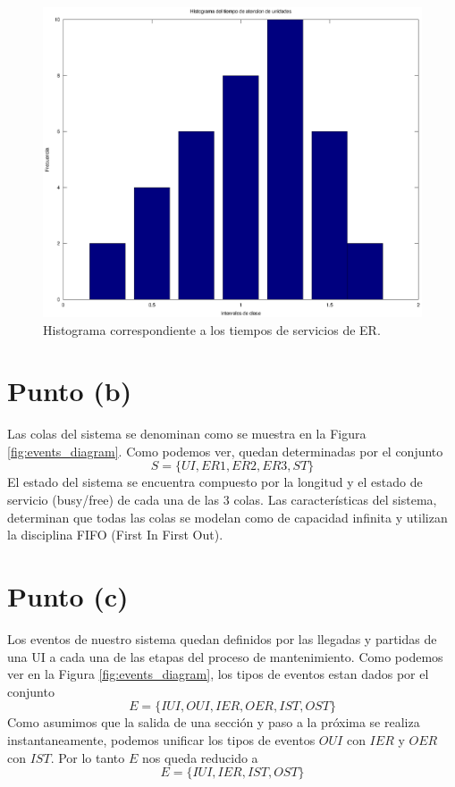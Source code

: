 \documentclass[a4paper,10pt]{article}
\begin{document}
\begin{figure}[h]
\begin{center}
\includegraphics[width=15cm]{../src/parteA/hist_servicios.eps}
\caption{\label{fig:hist_servicios} Histograma correspondiente a los tiempos de servicios de ER.}
\end{center}
\end{figure}

\section{Punto (b)}
Las colas del sistema se denominan como se muestra en la Figura \ref{fig:events_diagram}. Como podemos ver, quedan
determinadas por el conjunto 
\[
S = \{UI, ER1, ER2, ER3, ST\}
\]
El estado del sistema se encuentra compuesto por la longitud y el estado de servicio (busy/free) de cada una de las 3 colas. Las características del sistema, determinan que todas las colas se modelan como de capacidad infinita y utilizan la disciplina FIFO (First In First Out).

\section{Punto (c)}
Los eventos de nuestro sistema quedan definidos por las llegadas y partidas de una UI a cada una de las etapas del proceso de mantenimiento. Como podemos ver en la Figura \ref{fig:events_diagram}, los tipos de eventos estan dados por el conjunto
\[
 E = \{IUI, OUI, IER, OER, IST, OST\}
\]
Como asumimos que la salida de una sección y paso a la próxima se realiza instantaneamente, podemos unificar los tipos de eventos $OUI$ con $IER$ y $OER$ con $IST$. Por lo tanto $E$ nos queda reducido a
\[
 E = \{IUI, IER, IST, OST\}
\]
\end{document}
